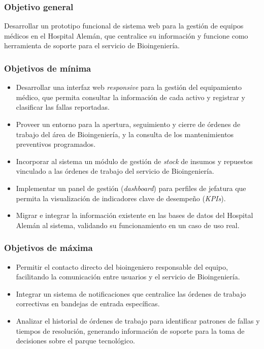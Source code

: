 \documentclass[10pt]{article}
\begin{document}
\subsubsection{Objetivo general}
Desarrollar un prototipo funcional de sistema web para la gestión de equipos médicos en el Hospital
Alemán, que centralice su información y funcione como herramienta de soporte para el servicio de
Bioingeniería.

\subsubsection{Objetivos de mínima}
\label{sec:objetivos-minima}
\begin{itemize}
    \item Desarrollar una interfaz web \textit{responsive} para la gestión del equipamiento médico, que
permita consultar la información de cada activo y registrar y clasificar las fallas
reportadas.
    \item Proveer un entorno para la apertura, seguimiento y cierre de órdenes de trabajo del área de
Bioingeniería, y la consulta de los mantenimientos preventivos programados.
    \item Incorporar al sistema un módulo de gestión de \textit{stock} de insumos y repuestos
vinculado a las órdenes de trabajo del servicio de Bioingeniería.
    \item Implementar un panel de gestión (\emph {dashboard}) para perfiles de jefatura que permita la
visualización de indicadores clave de desempeño (\emph {KPIs}).
    \item Migrar e integrar la información existente en las bases de datos del Hospital Alemán
al sistema, validando su funcionamiento en un caso de uso real.
\end{itemize}

\subsubsection{Objetivos de máxima}
\begin{itemize}
    \item Permitir el contacto directo del bioingeniero responsable del equipo, facilitando la
comunicación entre usuarios y el servicio de Bioingeniería.
    \item Integrar un sistema de notificaciones que centralice las órdenes de trabajo correctivas
en bandejas de entrada específicas.
    \item Analizar el historial de órdenes de trabajo para identificar patrones de fallas y tiempos
de resolución, generando información de soporte para la toma de decisiones sobre el
parque tecnológico.
\end{itemize}
\end{document}
